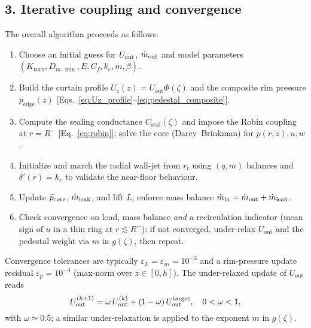 \documentclass[11pt,a4paper]{article}
\begin{document}
\subsection*{3. Iterative coupling and convergence}
The overall algorithm proceeds as follows:
\begin{enumerate}
  \item Choose an initial guess for \(U_{\rm out}\), \(\dot m_{\rm out}\) and model parameters \((K_{\mathrm{turn}},D_{m,\min},E,C_f,k_e,m,\beta)\).
  \item Build the curtain profile \(U_z(z)=U_{\mathrm{out}}\Phi(\zeta)\) and the composite rim pressure \(p_{\mathrm{edge}}(z)\) [Eqs.~\eqref{eq:Uz_profile}--\eqref{eq:pedestal_composite}].
  \item Compute the sealing conductance \(C_{\mathrm{seal}}(\zeta)\) and impose the Robin coupling at \(r=R^{-}\) [Eq.~\eqref{eq:robin}]; solve the core (Darcy--Brinkman) for \(p(r,z),u,w\).
  \item Initialize and march the radial wall-jet from \(r_t\) using \((q,m)\) balances and \(\delta'(r)=k_e\) to validate the near-floor behaviour.
  \item Update \(\bar p_{\rm core}\), \(\dot m_{\rm leak}\), and lift \(L\); enforce mass balance \(\dot m_{\rm in}=\dot m_{\rm out}+\dot m_{\rm leak}\).
  \item Check convergence on load, mass balance \emph{and} a recirculation indicator (mean sign of \(u\) in a thin ring at \(r\lesssim R^{-}\)): if not converged, under-relax \(U_{\mathrm{out}}\) and the pedestal weight via \(m\) in \(g(\zeta)\), then repeat.
\end{enumerate}

Convergence tolerances are typically $\varepsilon_L=\varepsilon_m=10^{-3}$ and a rim-pressure update residual $\varepsilon_p=10^{-4}$ (max-norm over $z\!\in\![0,h]$).
The under-relaxed update of \(U_{\mathrm{out}}\) reads
\[
  U_{\mathrm{out}}^{(k+1)} = \omega\,U_{\mathrm{out}}^{(k)} + (1-\omega)\,U_{\mathrm{out}}^{\rm target}, 
  \quad 0<\omega<1,
\]
with \(\omega\simeq 0.5\); a similar under-relaxation is applied to the exponent \(m\) in \(g(\zeta)\).
\end{document}
